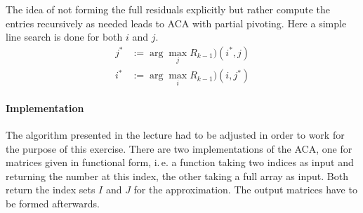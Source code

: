 \documentclass[%
a4paper,
parskip=half,
DIV=calc,
]
{scrartcl}
\begin{document}
The idea of not forming the full residuals explicitly but rather
compute the entries recursively as needed leads to ACA with partial
pivoting.  Here a simple line search is done for both $i$ and $j$.
\begin{align*}
  j^* &:= \arg\max_j R_{k-1})(i^*, j) \\
  i^* &:= \arg\max_i R_{k-1})(i, j^*)
\end{align*}


\paragraph{Implementation}
The algorithm presented in the lecture had to be adjusted in order to
work for the purpose of this exercise.  There are two implementations
of the ACA, one for matrices given in functional form, i.\,e. a
function taking two indices as input and returning the number at this
index, the other taking a full array as input. Both return the index
sets $I$ and $J$ for the approximation. The output matrices have to be
formed afterwards.
\end{document}
